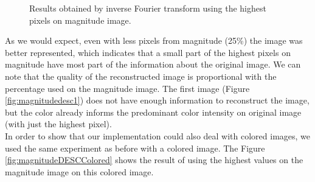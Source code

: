\documentclass[12pt,a4paper]{article}
\begin{document}
\begin{figure}[!h]
{{		}
		\label{fig:magnitudedesc50}
	}
	\quad

	\caption{Results obtained by inverse Fourier transform using the highest pixels on magnitude image.}
	\label{fig:magnitudeDESC}
\end{figure}

As we would expect, even with less pixels from magnitude (25\%) the image was better represented, which indicates that a small part of the highest pixels on magnitude have most part of the information about the original image.  We can note that the quality of the reconstructed image is proportional with the percentage used on the magnitude image. The first image (Figure \ref{fig:magnitudedesc1}) does not have enough information to reconstruct the image, but the color already informs the predominant color intensity on original image (with just the highest pixel). \\

In order to show that our implementation could also deal with colored images, we used the same experiment as before with a colored image. The Figure \ref{fig:magnitudeDESCColored} shows the result of using the highest values on the magnitude image on this colored image. \\
\end{document}
